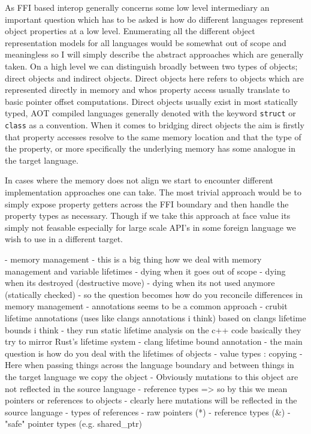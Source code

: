 As FFI based interop generally concerns some low level intermediary an important question which has to be asked is how do different languages represent object properties at a low level. Enumerating all the different object representation models for all languages would be somewhat out of scope and meaningless so I will simply describe the abstract approaches which are generally taken. On a high level we can distinguish broadly between two types of objects; direct objects and indirect objects. Direct objects here refers to objects which are represented directly in memory and whos property access usually translate to basic pointer offset computations. Direct objects usually exist in most statically typed, AOT compiled languages generally denoted with the keyword \texttt{struct} or \texttt{class} as a convention. When it comes to bridging direct objects the aim is firstly that property accesses resolve to the same memory location and that the type of the property, or more specifically the underlying memory has some analogue in the target language.

In cases where the memory does not align we start to encounter different implementation approaches one can take. The most trivial approach would be to simply expose property getters across the FFI boundary and then handle the property types as necessary. Though if we take this approach at face value its simply not feasable especially for large scale API's in some foreign language we wish to use in a different target. 

- memory management    
    - this is a big thing how we deal with memory management and variable lifetimes 
        - dying when it goes out of scope 
        - dying when its destroyed (destructive move)
        - dying when its not used anymore (statically checked)
    - so the question becomes how do you reconcile differences in memory management
        - annotations seems to be a common approach 
            - crubit lifetime annotations (uses like clangs annotations i think) based on clangs lifetime bounds i think
                - they run static lifetime analysis on the c++ code basically they try to mirror Rust's lifetime system 
            - clang lifetime bound annotation
    - the main question is how do you deal with the lifetimes of objects 
        - value types : copying 
            - Here when passing things across the language boundary and between things in the target language we copy the object
            - Obviously mutations to this object are not reflected in the source language 
        - reference types
            => so by this we mean pointers or references to objects 
            - clearly here mutations will be reflected in the source language 
            - types of references 
                - raw pointers (*)
                - reference types (&)
                - "safe" pointer types (e.g. shared_ptr)

